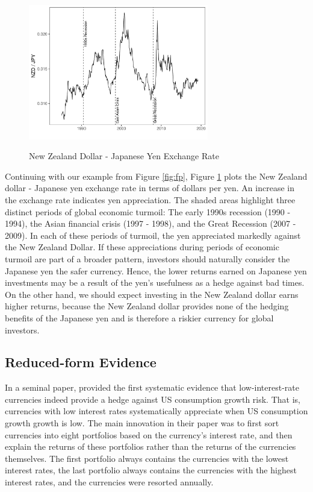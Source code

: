 \documentclass[12pt,letter]{article}
\theoremstyle{break} \theorembodyfont{\normalfont\itshape}
\theoremstyle{break}
\theoremstyle{break} \theorembodyfont{\normalfont\itshape}
\theoremstyle{break} \theorembodyfont{\normalfont\itshape}
\begin{document}
\begin{figure}[htp!]
    \centering
    \caption{New Zealand Dollar - Japanese Yen Exchange Rate} 
    \includegraphics[width=0.7\textwidth]{Exhibits/Figure_FX_JPYNZD.pdf}
    \label{fig:spot}
\end{figure}
Continuing with our example from Figure \ref{fig:fp}, Figure \ref{fig:spot} plots the New
Zealand dollar - Japanese yen exchange rate in terms of dollars per
yen. An increase in the exchange rate indicates yen appreciation.
The shaded areas highlight three distinct periods of global economic
turmoil: The early 1990s recession (1990 - 1994), the Asian financial
crisis (1997 - 1998), and the Great Recession (2007 - 2009). In each of these periods of turmoil, the yen appreciated markedly against the New Zealand Dollar. If these appreciations during periods of economic
turmoil are part of a broader pattern, investors should naturally consider the Japanese yen the safer
currency. Hence, the lower returns earned on Japanese yen investments 
may be a result of the yen's usefulness as a hedge against bad times. 
On the other hand, we should expect investing in the New Zealand dollar 
earns higher returns, because the New Zealand dollar provides none of 
the hedging benefits of the Japanese yen and is therefore a riskier 
currency for global investors.

\subsection{Reduced-form Evidence}

In a seminal paper, \citet{LustigVerdelhan2007} provided  the first systematic evidence 
that low-interest-rate currencies indeed provide a hedge against US consumption growth risk. That is, currencies with low interest rates systematically appreciate when US consumption growth growth is low. 
The main innovation in their paper was to first sort currencies into eight 
portfolios based on the currency's interest rate, and then explain the returns 
of these portfolios rather than the returns of the currencies themselves. The 
first portfolio always contains the currencies with the lowest interest rates, 
the last portfolio always contains the currencies with the highest interest 
rates, and the currencies were resorted annually.
\end{document}
